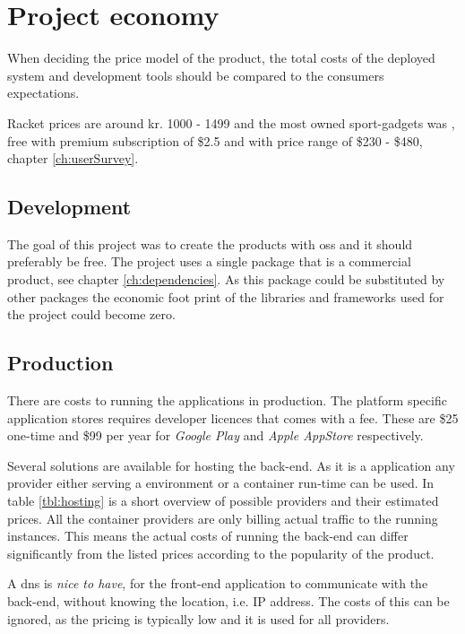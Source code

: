 \chapter{Project economy}
When deciding the price model of the product, the total costs of the deployed system and development tools should be compared to the consumers expectations.

Racket prices are around kr. 1000 - 1499 and the most owned sport-gadgets was , free with premium subscription of \$2.5 and  with price range of \$230 - \$480, chapter \ref{ch:userSurvey}.

\section{Development}
The goal of this project was to create the products with \gls{oss} and it should preferably be free.
The project uses a single package that is a commercial product, see chapter \ref{ch:dependencies}.
As this package could be substituted by other packages the economic foot print of the libraries and frameworks used for the project could become zero.

\section{Production}
There are costs to running the applications in production.
The platform specific application stores requires developer licences that comes with a fee.
These are \$25 one-time \citep{economy:play} and \$99 per year \citep{economy:appStore} for \textit{Google Play} and \textit{Apple AppStore} respectively.

Several solutions are available for hosting the back-end.
As it is a  application any provider either serving a  environment or a container run-time can be used.
In table \ref{tbl:hosting} is a short overview of possible providers and their estimated prices.
All the container providers are only billing actual traffic to the running instances.
This means the actual costs of running the back-end can differ significantly from the listed prices according to the popularity of the product.

A \gls{dns} is \textit{nice to have}, for the front-end application to communicate with the back-end, without knowing the location, i.e. IP address.
The costs of this can be ignored, as the pricing is typically low and it is used for all providers.

